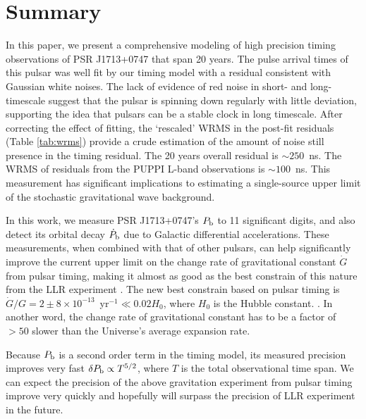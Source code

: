 \section{Summary}
In this paper, we present a comprehensive modeling of high precision timing observations of
PSR J1713+0747 that span 20 years. 
The pulse arrival times of this pulsar was well fit by our timing model with a
residual consistent with Gaussian white noises.
The lack of evidence of red noise in short- and long-timescale suggest that
the pulsar is spinning down regularly with little deviation, supporting the
idea that pulsars can be a stable clock in long timescale.
After correcting the effect of fitting, the `rescaled' WRMS in the post-fit residuals (Table \ref{tab:wrms}) provide a crude estimation of
the amount of noise still presence in the timing residual. The 20 years
overall residual is $\sim 250$~ns. The WRMS of residuals from the PUPPI L-band
observations is $\sim100$~ns.
This measurement has significant implications to estimating a single-source
upper limit of the stochastic gravitational wave background.


In this work, we measure PSR J1713+0747's $P_{\rm b}$ to 11 significant
digits, and also detect its orbital decay $\dot{P}_{\rm b}$ due to Galactic differential accelerations.
These measurements, when combined with that of other pulsars, can help
significantly improve the current upper limit on the change rate of gravitational
 constant $\dot{G}$ from pulsar timing, making it almost as good as the best
constrain of this nature from the LLR experiment \citep{hmb10}.
The new best constrain based on pulsar timing is $\dot{G}/G
=2\pm8\times10^{-13}$~yr$^{-1}\ll0.02H_0$, where $H_0$ is the Hubble constant. . 
In another word, the change rate of gravitational constant has to be a factor of $>50$
slower than the Universe's average expansion rate.

Because $P_{\rm b}$ is a second order term in the timing 
model, its measured precision improves very fast $\delta
P_{\rm b} \propto T^{5/2}$, where $T$ is the total observational time span.
We can expect the precision of the above gravitation experiment from pulsar
timing improve very quickly and hopefully will surpass the precision of LLR
experiment in the future.


